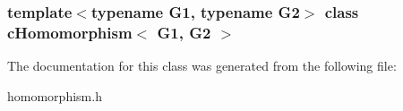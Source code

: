 \subsubsection*{template$<$typename G1, typename G2$>$ class c\-Homomorphism$<$ G1, G2 $>$}



\-The documentation for this class was generated from the following file\-:\begin{DoxyCompactItemize}
\item 
homomorphism.\-h\end{DoxyCompactItemize}
